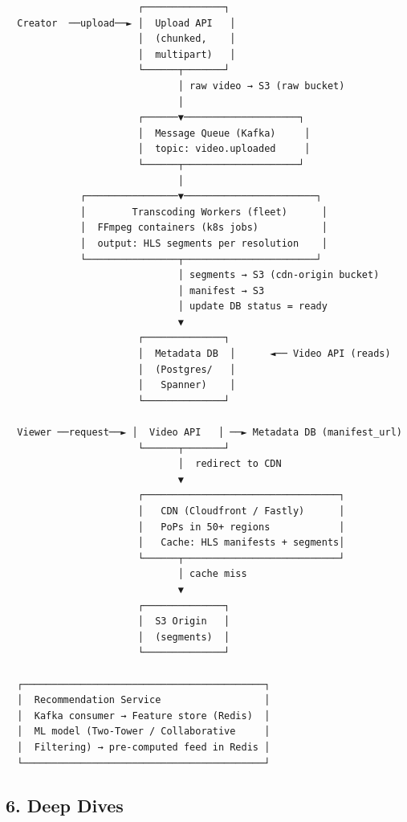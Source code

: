 \documentclass[11pt]{article}
\begin{document}
\begin{verbatim}
                       ┌──────────────┐
  Creator  ──upload──► │  Upload API   │
                       │  (chunked,    │
                       │  multipart)   │
                       └──────┬───────┘
                              │ raw video → S3 (raw bucket)
                              │
                       ┌──────▼────────────────────┐
                       │  Message Queue (Kafka)     │
                       │  topic: video.uploaded     │
                       └──────┬────────────────────┘
                              │
             ┌────────────────▼───────────────────────┐
             │        Transcoding Workers (fleet)      │
             │  FFmpeg containers (k8s jobs)           │
             │  output: HLS segments per resolution    │
             └────────────────┬───────────────────────┘
                              │ segments → S3 (cdn-origin bucket)
                              │ manifest → S3
                              │ update DB status = ready
                              ▼
                       ┌──────────────┐
                       │  Metadata DB  │      ◄── Video API (reads)
                       │  (Postgres/   │
                       │   Spanner)    │
                       └──────────────┘

  Viewer ──request──► │  Video API   │ ──► Metadata DB (manifest_url)
                       └──────┬───────┘
                              │  redirect to CDN
                              ▼
                       ┌──────────────────────────────────┐
                       │   CDN (Cloudfront / Fastly)      │
                       │   PoPs in 50+ regions            │
                       │   Cache: HLS manifests + segments│
                       └──────┬───────────────────────────┘
                              │ cache miss
                              ▼
                       ┌──────────────┐
                       │  S3 Origin   │
                       │  (segments)  │
                       └──────────────┘

  ┌──────────────────────────────────────────┐
  │  Recommendation Service                  │
  │  Kafka consumer → Feature store (Redis)  │
  │  ML model (Two-Tower / Collaborative     │
  │  Filtering) → pre-computed feed in Redis │
  └──────────────────────────────────────────┘
\end{verbatim}

\subsection{6. Deep Dives}\label{6-deep-dives}
\end{document}
